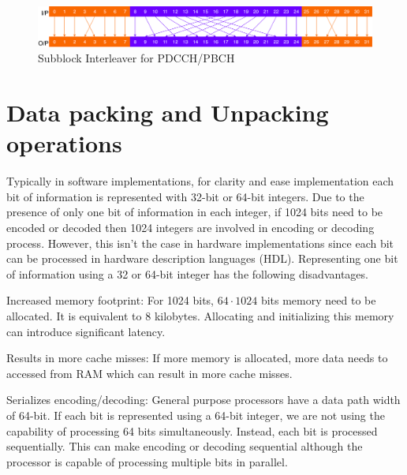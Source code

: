 \begin{figure}[h]
	\centering
	\includegraphics[width=1\textwidth]{./figures/subblockInterleaver.pdf}
	\caption{Subblock Interleaver for PDCCH/PBCH}
	\label{fig:subblockInterleaver}
\end{figure}

\section{Data packing and Unpacking operations} \label{dataPackUnpack}
Typically in software implementations, for clarity and ease implementation each bit of information is represented with 32-bit or 64-bit integers. Due to the presence of only one bit of information in each integer, if 1024 bits need to be encoded or decoded then 1024 integers are involved in encoding or decoding process. However, this isn't the case in hardware implementations since each bit can be processed in hardware description languages (HDL). Representing one bit of information using a 32 or 64-bit integer has the following disadvantages.

\begin{description}[font=$\bullet$~\normalfont]
	\item Increased memory footprint: For 1024 bits, $64\cdot1024$ bits memory need to be allocated. It is equivalent to 8 kilobytes. Allocating and initializing this memory can introduce significant latency.
	\item Results in more cache misses: If more memory is allocated, more data needs to accessed from RAM which can result in more cache misses.
	\item Serializes encoding/decoding: General purpose processors have a data path width of 64-bit. If each bit is represented using a 64-bit integer, we are not using the capability of processing 64 bits simultaneously. Instead, each bit is processed sequentially. This can make encoding or decoding sequential although the processor is capable of processing multiple bits in parallel.
\end{description}

